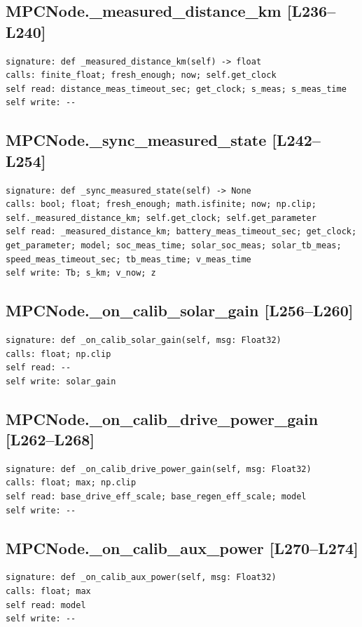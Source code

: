 \documentclass[a4paper,10pt,oneside]{book}
\begin{document}
\subsection*{MPCNode.\_measured\_distance\_km [L236--L240]}
\begin{lstlisting}[numbers=none]
signature: def _measured_distance_km(self) -> float
calls: finite_float; fresh_enough; now; self.get_clock
self read: distance_meas_timeout_sec; get_clock; s_meas; s_meas_time
self write: --
\end{lstlisting}
\subsection*{MPCNode.\_sync\_measured\_state [L242--L254]}
\begin{lstlisting}[numbers=none]
signature: def _sync_measured_state(self) -> None
calls: bool; float; fresh_enough; math.isfinite; now; np.clip; self._measured_distance_km; self.get_clock; self.get_parameter
self read: _measured_distance_km; battery_meas_timeout_sec; get_clock; get_parameter; model; soc_meas_time; solar_soc_meas; solar_tb_meas; speed_meas_timeout_sec; tb_meas_time; v_meas_time
self write: Tb; s_km; v_now; z
\end{lstlisting}
\subsection*{MPCNode.\_on\_calib\_solar\_gain [L256--L260]}
\begin{lstlisting}[numbers=none]
signature: def _on_calib_solar_gain(self, msg: Float32)
calls: float; np.clip
self read: --
self write: solar_gain
\end{lstlisting}
\subsection*{MPCNode.\_on\_calib\_drive\_power\_gain [L262--L268]}
\begin{lstlisting}[numbers=none]
signature: def _on_calib_drive_power_gain(self, msg: Float32)
calls: float; max; np.clip
self read: base_drive_eff_scale; base_regen_eff_scale; model
self write: --
\end{lstlisting}
\subsection*{MPCNode.\_on\_calib\_aux\_power [L270--L274]}
\begin{lstlisting}[numbers=none]
signature: def _on_calib_aux_power(self, msg: Float32)
calls: float; max
self read: model
self write: --
\end{lstlisting}
\end{document}
